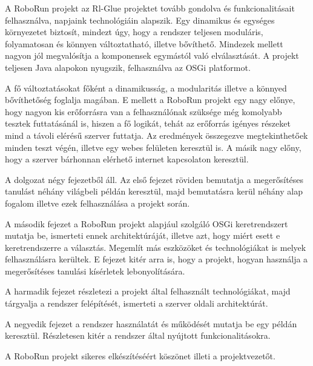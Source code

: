 	A RoboRun projekt az Rl-Glue projektet tovább gondolva és funkcionalitásait felhasználva, napjaink technológiáin alapszik. Egy dinamikus és egységes környezetet biztosít, mindezt úgy, hogy a rendszer teljesen moduláris, folyamatosan és könnyen változtatható, illetve bővíthető. Mindezek mellett nagyon jól megvalósítja a komponensek egymástól való elválasztását. A projekt teljesen Java alapokon nyugszik, felhasználva az OSGi platformot. 
	
	A fő változtatásokat főként a dinamikusság, a modularitás illetve a könnyed bővíthetőség foglalja magában. E mellett a RoboRun projekt egy nagy előnye, hogy nagyon kis erőforrásra van a felhasználónak szüksége még komolyabb tesztek futtatásánál is, hiszen a fő logikát, tehát az erőforrás igényes részeket mind a távoli elérésű szerver futtatja. Az eredmények összegezve megtekinthetőek minden teszt végén, illetve egy webes felületen keresztül is. A másik nagy előny, hogy a szerver bárhonnan elérhető internet kapcsolaton keresztül. 
	
	A dolgozat négy fejezetből áll. Az első fejezet röviden bemutatja a megerősítéses tanulást néhány világbeli példán keresztül, majd bemutatásra kerül néhány alap fogalom illetve ezek felhasználása a projekt során.
	
	A második fejezet a RoboRun projekt alapjául szolgáló OSGi keretrendszert mutatja be, ismerteti ennek architektúráját, illetve azt, hogy  miért esett e keretrendszerre a választás. Megemlít más eszközöket és technológiákat is melyek felhasználásra kerültek. E fejezet kitér arra is, hogy a projekt, hogyan használja a megerősítéses tanulási kísérletek lebonyolítására.
	
	A harmadik fejezet részletezi a projekt által felhasznált technológiákat, majd tárgyalja a rendszer felépítését, ismerteti a szerver oldali architektúrát. 
	
	A negyedik fejezet a rendszer használatát és működését mutatja be egy példán keresztül. Részletesen kitér a rendszer által nyújtott funkcionalitásokra. 
	
	A RoboRun projekt sikeres elkészítéséért köszönet illeti a projektvezetőt.
